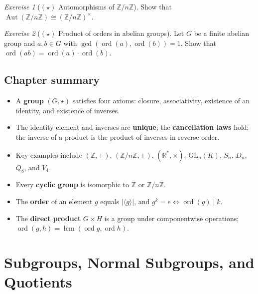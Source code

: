 \documentclass[12pt,a4paper,openany]{book}
\theoremstyle{definition}
\theoremstyle{remark}
\newtheorem{exercise}{Exercise}[chapter]
\newcommand{\Z}{\mathbb{Z}}
\newcommand{\R}{\mathbb{R}}
\DeclareMathOperator{\Aut}{Aut}
\DeclareMathOperator{\ord}{ord}
\DeclareMathOperator{\lcm}{lcm}
\renewcommand{\gcd}{\operatorname{gcd}}
\begin{document}
\begin{exercise}[$(\star)$ Automorphisms of $\Z/n\Z$]
\label{exer:ch1-11}
Show that $\Aut(\Z/n\Z)\cong (\Z/n\Z)^\times$.
\end{exercise}

\begin{exercise}[$(\star)$ Product of orders in abelian groups]
\label{exer:ch1-12}
Let $G$ be a finite abelian group and $a,b\in G$ with $\gcd(\ord(a),
\ord(b))=1$.  Show that $\ord(ab)=\ord(a)\cdot\ord(b)$.
\end{exercise}

\section*{Chapter summary}

\begin{itemize}[leftmargin=2em]
  \item A \textbf{group} $(G,\star)$ satisfies four axioms: closure,
    associativity, existence of an identity, and existence of inverses.
  \item The identity element and inverses are \textbf{unique}; the
    \textbf{cancellation laws} hold; the inverse of a product is the product
    of inverses in reverse order.
  \item Key examples include $(\Z,+)$, $(\Z/n\Z,+)$, $(\R^*,\times)$,
    $\text{GL}_n(K)$, $S_n$, $D_n$, $Q_8$, and $V_4$.
  \item Every \textbf{cyclic group} is isomorphic to $\Z$ or $\Z/n\Z$.
  \item The \textbf{order} of an element $g$ equals $|\langle g\rangle|$,
    and $g^k=e\iff\ord(g)\mid k$.
  \item The \textbf{direct product} $G\times H$ is a group under
    componentwise operations; $\ord(g,h)=\lcm(\ord g,\ord h)$.
\end{itemize}

\chapter{Subgroups, Normal Subgroups, and Quotients}
\label{chap:subgroups-quotients}

\end{document}
